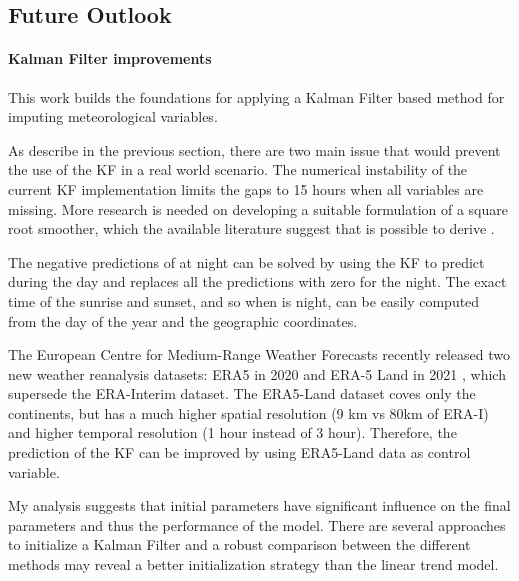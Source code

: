 \documentclass{article}
\let\Oldsubsection\subsection
\renewcommand{\subsection}{\FloatBarrier\Oldsubsection}
\begin{document}
\subsection{Future Outlook}

\paragraph{Kalman Filter improvements} This work builds the foundations for applying a Kalman Filter based method for imputing meteorological variables.

As describe in the previous section, there are two main issue that would prevent the use of the KF in a real world scenario.
The numerical instability of the current KF implementation limits the gaps to 15 hours when all variables are missing.
More research is needed on developing a suitable formulation of a square root smoother, which the available literature suggest that is possible to derive \cite{rutten_square-root_2013, park_new_1996}. 

The negative predictions of  at night can be solved by using the KF to predict  during the day and replaces all the predictions with zero for the night. The exact time of the sunrise and sunset, and so when is night, can be easily computed from the day of the year and the geographic coordinates.

The European Centre for Medium-Range Weather Forecasts recently released two new weather reanalysis datasets: ERA5 in 2020 \cite{hersbach_era5_2020} and ERA-5 Land  in 2021 \cite{munoz-sabater_era5-land_2021}, which supersede the ERA-Interim dataset. The ERA5-Land dataset coves only the continents, but has a much higher spatial resolution (9 km vs 80km of ERA-I) and higher temporal resolution (1 hour instead of 3 hour). Therefore, the prediction of the KF can be improved by using ERA5-Land data as control variable.

My analysis suggests that initial parameters have significant influence on the final parameters and thus the performance of the model. There are several approaches to initialize a Kalman Filter \cite{durbin_time_2012} and a robust comparison between the different methods may reveal a better initialization strategy than the linear trend model.  
\end{document}
